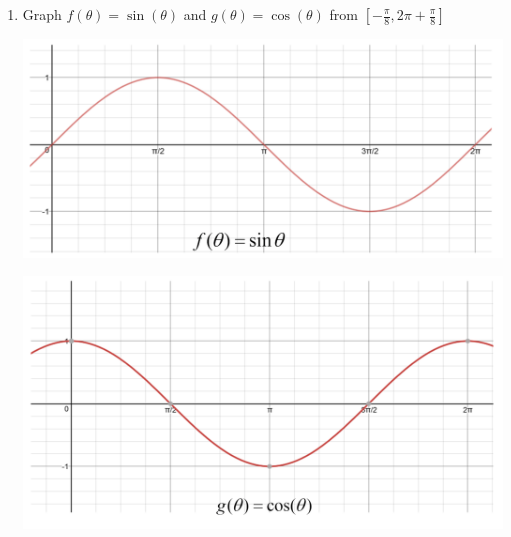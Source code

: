 \documentclass[nooutcomes]{ximera}
\begin{document}
\begin{problem} \hfil

\begin{enumerate}
	\item Graph $f(\theta)=\sin(\theta)$ and $g(\theta)=\cos(\theta)$ from $[-\frac{\pi}{8},2\pi+\frac{\pi}{8}]$
		\begin{freeResponse} \hfil
		\begin{image}
		\includegraphics[scale=.3]{figure8.png}
		\end{image}
		\begin{image}
		\includegraphics[scale=.3]{figure9.png}
		\end{image}
		\end{freeResponse}


\end{enumerate}
\end{problem}
\end{document}
